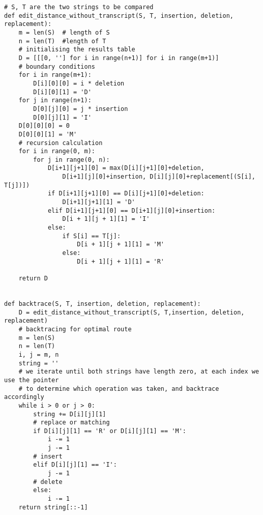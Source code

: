 \lstset{basicstyle=\footnotesize,style=myCustomMatlabStyle}
\begin{lstlisting}
# S, T are the two strings to be compared
def edit_distance_without_transcript(S, T, insertion, deletion, replacement):
    m = len(S)  # length of S
    n = len(T)  #length of T
    # initialising the results table
    D = [[[0, ''] for i in range(n+1)] for i in range(m+1)]
    # boundary conditions
    for i in range(m+1):
        D[i][0][0] = i * deletion
        D[i][0][1] = 'D'
    for j in range(n+1):
        D[0][j][0] = j * insertion
        D[0][j][1] = 'I'
    D[0][0][0] = 0
    D[0][0][1] = 'M'
    # recursion calculation
    for i in range(0, m):
        for j in range(0, n):
            D[i+1][j+1][0] = max(D[i][j+1][0]+deletion,
                D[i+1][j][0]+insertion, D[i][j][0]+replacement[(S[i], T[j])])
            if D[i+1][j+1][0] == D[i][j+1][0]+deletion:
                D[i+1][j+1][1] = 'D'
            elif D[i+1][j+1][0] == D[i+1][j][0]+insertion:
                D[i + 1][j + 1][1] = 'I'
            else:
                if S[i] == T[j]:
                    D[i + 1][j + 1][1] = 'M'
                else:
                    D[i + 1][j + 1][1] = 'R'

    return D


def backtrace(S, T, insertion, deletion, replacement):
    D = edit_distance_without_transcript(S, T,insertion, deletion, replacement)
    # backtracing for optimal route
    m = len(S)
    n = len(T)
    i, j = m, n
    string = ''
    # we iterate until both strings have length zero, at each index we use the pointer
    # to determine which operation was taken, and backtrace accordingly
    while i > 0 or j > 0:
        string += D[i][j][1]
        # replace or matching
        if D[i][j][1] == 'R' or D[i][j][1] == 'M':
            i -= 1
            j -= 1
        # insert
        elif D[i][j][1] == 'I':
            j -= 1
        # delete
        else:
            i -= 1
    return string[::-1]


\end{lstlisting}